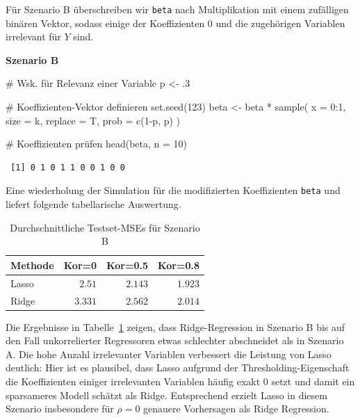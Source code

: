 \documentclass[
  a4paper,
  DIV=11,
  oneside]{scrreprt}
\newenvironment{Shaded}{\begin{snugshade}}{\end{snugshade}}
\newcommand{\AttributeTok}[1]{\textcolor[rgb]{0.40,0.45,0.13}{#1}}
\newcommand{\CommentTok}[1]{\textcolor[rgb]{0.37,0.37,0.37}{#1}}
\newcommand{\DecValTok}[1]{\textcolor[rgb]{0.68,0.00,0.00}{#1}}
\newcommand{\FunctionTok}[1]{\textcolor[rgb]{0.28,0.35,0.67}{#1}}
\newcommand{\NormalTok}[1]{\textcolor[rgb]{0.00,0.23,0.31}{#1}}
\newcommand{\OtherTok}[1]{\textcolor[rgb]{0.00,0.23,0.31}{#1}}
\newcommand{\SpecialCharTok}[1]{\textcolor[rgb]{0.37,0.37,0.37}{#1}}
\begin{document}
Für Szenario B überschreiben wir \texttt{beta} nach Multiplikation mit
einem zufälligen binären Vektor, sodass einige der Koeffizienten \(0\)
und die zugehörigen Variablen irrelevant für \(Y\) sind.

\textbf{Szenario B}

\begin{Shaded}
\begin{Highlighting}[]
\CommentTok{\# Wsk. für Relevanz einer Variable}
\NormalTok{p }\OtherTok{\textless{}{-}}\NormalTok{ .}\DecValTok{3}

\CommentTok{\# Koeffizienten{-}Vektor definieren}
\FunctionTok{set.seed}\NormalTok{(}\DecValTok{123}\NormalTok{)}
\NormalTok{beta }\OtherTok{\textless{}{-}}\NormalTok{ beta }\SpecialCharTok{*} \FunctionTok{sample}\NormalTok{(}
  \AttributeTok{x =} \DecValTok{0}\SpecialCharTok{:}\DecValTok{1}\NormalTok{, }
  \AttributeTok{size =}\NormalTok{ k, }
  \AttributeTok{replace =}\NormalTok{ T, }
  \AttributeTok{prob =} \FunctionTok{c}\NormalTok{(}\DecValTok{1}\SpecialCharTok{{-}}\NormalTok{p, p)}
\NormalTok{)}

\CommentTok{\# Koeffizienten prüfen}
\FunctionTok{head}\NormalTok{(beta, }\AttributeTok{n =} \DecValTok{10}\NormalTok{)}
\end{Highlighting}
\end{Shaded}

\begin{verbatim}
 [1] 0 1 0 1 1 0 0 1 0 0
\end{verbatim}

Eine wiederholung der Simulation für die modifizierten Koeffizienten
\texttt{beta} und liefert folgende tabellarische Auswertung.

\begin{longtable}{lrrr}

\caption{\label{tbl-lrsimB}Durchschnittliche Testset-MSEs für Szenario
B}

\tabularnewline

\toprule
Methode & Kor=0 & Kor=0.5 & Kor=0.8 \\ 
\midrule\addlinespace[2.5pt]
Lasso & $2.51$ & $2.143$ & $1.923$ \\ 
Ridge & $3.331$ & $2.562$ & $2.014$ \\ 
\bottomrule

\end{longtable}

Die Ergebnisse in Tabelle~\ref{tbl-lrsimB} zeigen, dass Ridge-Regression
in Szenario B bis auf den Fall unkorrelierter Regressoren etwas
schlechter abschneidet als in Szenario A. Die hohe Anzahl irrelevanter
Variablen verbessert die Leistung von Lasso deutlich: Hier ist es
plausibel, dass Lasso aufgrund der Thresholding-Eigenschaft die
Koeffizienten einiger irrelevanten Variablen häufig exakt \(0\) setzt
und damit ein sparsameres Modell schätzt als Ridge. Entsprechend erzielt
Lasso in diesem Szenario insbesondere für \(\rho = 0\) genauere
Vorhersagen als Ridge Regression.
\end{document}
